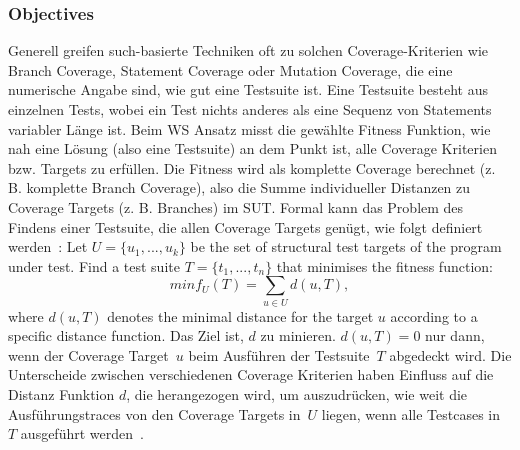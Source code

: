 \documentclass{article}
\begin{document}
\subsubsection{Objectives}
Generell greifen such-basierte Techniken oft zu solchen Coverage-Kriterien wie Branch Coverage, Statement Coverage oder Mutation Coverage, die eine numerische Angabe sind, wie gut eine Testsuite ist. Eine Testsuite besteht aus einzelnen Tests, wobei ein Test nichts anderes als eine Sequenz von Statements variabler Länge ist. Beim \ac{WS} Ansatz misst die gewählte Fitness Funktion, wie nah eine Lösung (also eine Testsuite) an dem Punkt ist, alle Coverage Kriterien bzw. Targets zu erfüllen. Die Fitness wird als komplette Coverage berechnet (z. B. komplette Branch Coverage), also die Summe individueller Distanzen zu Coverage Targets (z. B. Branches) im \ac{SUT}. Formal kann das Problem des Findens einer Testsuite, die allen Coverage Targets genügt, wie folgt definiert werden~\cite{Panichella2018}: Let $U = \{u_1, ..., u_k\}$ be the set of structural test targets of the program under test. Find a test suite $T = \{t_1, ..., t_n\}$ that minimises the fitness function:
\begin{equation}
minf_U(T) = \sum_{u \in U}{d(u, T)},
\end{equation}
where $d(u, T)$ denotes the minimal distance for the target $u$ according to a specific distance function. Das Ziel ist, $d$ zu minieren. $d(u, T) = 0$ nur dann, wenn der Coverage Target~$u$ beim Ausführen der Testsuite~$T$ abgedeckt wird. Die Unterscheide zwischen verschiedenen Coverage Kriterien haben Einfluss auf die Distanz Funktion $d$, die herangezogen wird, um auszudrücken, wie weit die Ausführungstraces von den Coverage Targets in~$U$ liegen, wenn alle Testcases in~$T$ ausgeführt werden~\cite{Panichella2018}.
\end{document}
